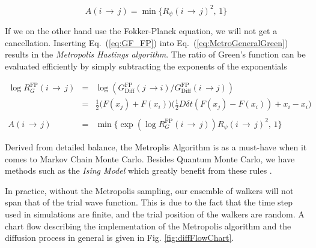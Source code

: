 \begin{equation}
\label{eq:Metropolis_standard}
 A(i\,\rightarrow\,j) = \min\{R_\psi(i\,\rightarrow\,j)^2, \,1\}
\end{equation}

If we on the other hand use the Fokker-Planck equation, we will not get a cancellation. Inserting Eq.~(\ref{eq:GF_FP}) into Eq.~(\ref{eq:MetroGeneralGreen}) results in the \textit{Metropolis Hastings algorithm}. The ratio of Green's function can be evaluated efficiently by simply subtracting the exponents of the exponentials

\begin{eqnarray}
 \log{R_G^\mathrm{FP}(i\,\rightarrow\,j)} &=& \log \left(G_\mathrm{Diff}^\mathrm{FP}(j\,\rightarrow i)/G_\mathrm{Diff}^\mathrm{FP}(i\,\rightarrow j)\right) \nonumber \\
                                    &=& \frac{1}{2}\big(F(x_j) + F(x_i)\big)\big(\frac{1}{2}D\delta t(F(x_j) - F(x_i)) + x_i - x_i\big) \\
                                    \nonumber\\
 A(i\,\rightarrow\,j) &=& \min\{\exp \left(\log R_G^\mathrm{FP}(i\,\rightarrow\,j)\right)R_\psi(i\,\rightarrow\,j)^2, \,1\} \label{eq:MetropolisHastings}
\end{eqnarray}

Derived from detailed balance, the Metroplis Algorithm is as a must-have when it comes to Markov Chain Monte Carlo. Besides Quantum Monte Carlo, we have methods such as the \textit{Ising Model} which greatly benefit from these rules \cite{morten}.

In practice, without the Metropolis sampling, our ensemble of walkers will not span that of the trial wave function. This is due to the fact that the time step used in simulations are finite, and the trial position of the walkers are random. A chart flow describing the implementation of the Metropolis algorithm and the diffusion process in general is given in Fig. \ref{fig:diffFlowChart}.

